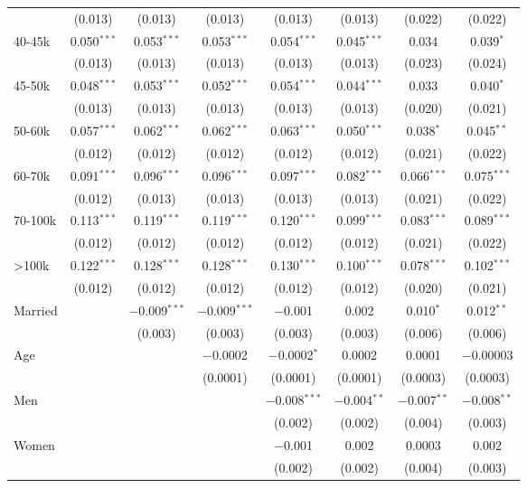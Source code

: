 \begin{table}[!htbp]
\begin{tabular}{@{\extracolsep{5pt}}lccccccc}
  & (0.013) & (0.013) & (0.013) & (0.013) & (0.013) & (0.022) & (0.022) \\ 
  40-45k & 0.050$^{***}$ & 0.053$^{***}$ & 0.053$^{***}$ & 0.054$^{***}$ & 0.045$^{***}$ & 0.034 & 0.039$^{*}$ \\ 
  & (0.013) & (0.013) & (0.013) & (0.013) & (0.013) & (0.023) & (0.024) \\ 
  45-50k & 0.048$^{***}$ & 0.053$^{***}$ & 0.052$^{***}$ & 0.054$^{***}$ & 0.044$^{***}$ & 0.033 & 0.040$^{*}$ \\ 
  & (0.013) & (0.013) & (0.013) & (0.013) & (0.013) & (0.020) & (0.021) \\ 
  50-60k & 0.057$^{***}$ & 0.062$^{***}$ & 0.062$^{***}$ & 0.063$^{***}$ & 0.050$^{***}$ & 0.038$^{*}$ & 0.045$^{**}$ \\ 
  & (0.012) & (0.012) & (0.012) & (0.012) & (0.012) & (0.021) & (0.022) \\ 
  60-70k & 0.091$^{***}$ & 0.096$^{***}$ & 0.096$^{***}$ & 0.097$^{***}$ & 0.082$^{***}$ & 0.066$^{***}$ & 0.075$^{***}$ \\ 
  & (0.012) & (0.013) & (0.013) & (0.013) & (0.013) & (0.021) & (0.022) \\ 
  70-100k & 0.113$^{***}$ & 0.119$^{***}$ & 0.119$^{***}$ & 0.120$^{***}$ & 0.099$^{***}$ & 0.083$^{***}$ & 0.089$^{***}$ \\ 
  & (0.012) & (0.012) & (0.012) & (0.012) & (0.012) & (0.021) & (0.022) \\ 
  >100k & 0.122$^{***}$ & 0.128$^{***}$ & 0.128$^{***}$ & 0.130$^{***}$ & 0.100$^{***}$ & 0.078$^{***}$ & 0.102$^{***}$ \\ 
  & (0.012) & (0.012) & (0.012) & (0.012) & (0.012) & (0.020) & (0.021) \\ 
  Married &  & $-$0.009$^{***}$ & $-$0.009$^{***}$ & $-$0.001 & 0.002 & 0.010$^{*}$ & 0.012$^{**}$ \\ 
  &  & (0.003) & (0.003) & (0.003) & (0.003) & (0.006) & (0.006) \\ 
  Age &  &  & $-$0.0002 & $-$0.0002$^{*}$ & 0.0002 & 0.0001 & $-$0.00003 \\ 
  &  &  & (0.0001) & (0.0001) & (0.0001) & (0.0003) & (0.0003) \\ 
  Men &  &  &  & $-$0.008$^{***}$ & $-$0.004$^{**}$ & $-$0.007$^{**}$ & $-$0.008$^{**}$ \\ 
  &  &  &  & (0.002) & (0.002) & (0.004) & (0.003) \\ 
  Women &  &  &  & $-$0.001 & 0.002 & 0.0003 & 0.002 \\ 
  &  &  &  & (0.002) & (0.002) & (0.004) & (0.003) \\ 

\end{tabular}
\end{table}
